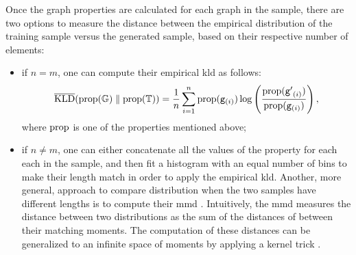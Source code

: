 Once the graph properties are calculated for each graph in the sample, there are two options to measure the distance between the empirical distribution of the training sample versus the generated sample, based on their respective number of elements:
\begin{itemize}
    \item if $n = m$, one can compute their empirical \gls{kld} as follows:
    $$\overline{\mathrm{KLD}}(\mathrm{prop}(\mathbb{G}) \;\Vert\; \mathrm{prop}(\mathbb{T})) = \frac{1}{n} \sum_{i=1}^{n} \mathrm{prop}(\mathtt{g}_{(i)}) \log \left( \frac{\mathrm{prop}(\mathtt{g'}_{(i)})}{\mathrm{prop}(\mathtt{g}_{(i)})} \right),$$
    where $\mathrm{prop}$ is one of the properties mentioned above;
    \item if $n \neq m$, one can either concatenate all the values of the property for each each in the sample, and then fit a histogram with an equal number of bins to make their length match in order to apply the empirical \gls{kld}. Another, more general, approach to compare distribution when the two samples have different lengths is to compute their \gls{mmd} \citep{gretton2012mmdkernel}. Intuitively, the \gls{mmd} measures the distance between two distributions as the sum of the distances of between their matching moments. The computation of these distances can be generalized to an infinite space of moments by applying a kernel trick \citep{smola2008kernels}.
\end{itemize}